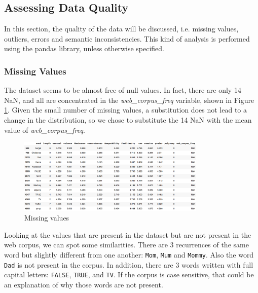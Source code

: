 \documentclass[a4paper,11pt,dvipsnames]{article}
\begin{document}








\subsection{Assessing Data Quality}
In this section, the quality of the data will be discussed, i.e. missing values, outliers, errors and semantic inconsistencies. This kind of analysis is performed using the pandas library, unless otherwise specified.

\subsubsection{Missing Values}

The dataset seems to be almost free of null values. In fact, there are only 14 NaN, and all are concentrated in the \textit{web\_corpus\_freq} variable, shown in Figure \ref{fig:missing}. Given the small number of missing values, a substitution does not lead to a change in the distribution, so we chose to substitute the 14 NaN with the mean value of \textit{web\_corpus\_freq}.

\begin{figure}[h]
    \centering
    \includegraphics[width=0.8\textwidth]{Graphs/NaN.png}
    \caption{Missing values}
    \label{fig:missing}
\end{figure}
Looking at the values that are present in the dataset but are not present in the web corpus, we can spot some similarities. There are 3 recurrences of the same word but slightly different from one another: \texttt{Mom}, \texttt{Mum} and \texttt{Mommy}. Also the word \texttt{Dad} is not present in the corpus. In addition, there are 3 words written with full capital letters: \texttt{FALSE}, \texttt{TRUE}, and \texttt{TV}. If the corpus is case sensitive, that could be an explanation of why those words are not present.
\end{document}
